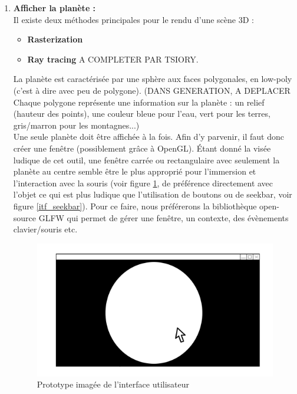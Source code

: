 \documentclass[a4paper]{article}
\begin{document}
\begin{enumerate}
        \item \textbf{Afficher la planète :} \\
        
        Il existe deux méthodes principales pour le rendu d'une scène 3D :
        \begin{itemize}
            \item \textbf{Rasterization}
            \item \textbf{Ray tracing}
            A COMPLETER PAR TSIORY.
        \end{itemize}
        La planète est caractérisée par une sphère aux faces polygonales, en low-poly (c'est à dire avec peu de polygone). (DANS GENERATION, A DEPLACER Chaque polygone représente une information sur la planète : un relief (hauteur des points), une couleur bleue pour l'eau, vert pour les terres, gris/marron pour les montagnes...)\\
        
        Une seule planète doit être affichée à la fois. Afin d'y parvenir, il faut donc créer une fenêtre (possiblement grâce à OpenGL). Étant donné la visée ludique de cet outil, une fenêtre carrée ou rectangulaire avec seulement la planète au centre semble être le plus approprié pour l'immersion et l'interaction avec la souris (voir figure \ref{itf_souris}, de préférence directement avec l'objet ce qui est plus ludique que l'utilisation de boutons ou de seekbar, voir figure \ref{itf_seekbar}). Pour ce faire, nous préférerons la bibliothèque open-source GLFW qui permet de gérer une fenêtre, un contexte, des évènements clavier/souris etc.\\
  
         \begin{figure}[!h]
        \begin{center} \includegraphics[width=\linewidth]{img/interface_souris.png} \end{center}
        \caption{\label{itf_souris} Prototype imagée de l'interface utilisateur}
        \end{figure}
        

\end{enumerate}
\end{document}
